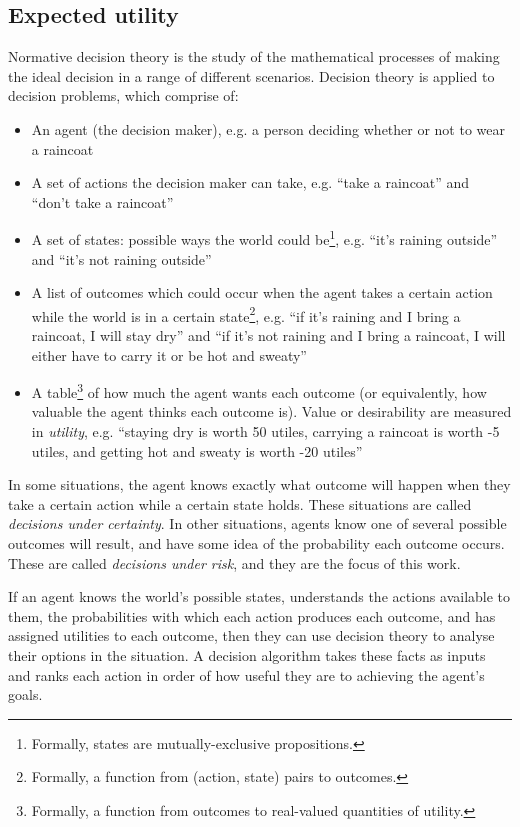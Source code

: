 \documentclass{article}
\begin{document}
\subsection{Expected utility}
Normative decision theory is the study of the mathematical processes of making the ideal decision in a range of different scenarios. Decision theory is applied to decision problems, which comprise of:

\begin{itemize}  
\item An agent (the decision maker), e.g. a person deciding whether or not to wear a raincoat
\item A set of actions the decision maker can take, e.g. ``take a raincoat'' and ``don't take a raincoat''
\item A set of states: possible ways the world could be\footnote{Formally, states are mutually-exclusive propositions.}, e.g. ``it's raining outside'' and ``it's not raining outside''
\item A list of outcomes which could occur when the agent takes a certain action while the world is in a certain state\footnote{Formally, a function from (action, state) pairs to outcomes.}, e.g. ``if it's raining and I bring a raincoat, I will stay dry'' and ``if it's not raining and I bring a raincoat, I will either have to carry it or be hot and sweaty''
\item A table\footnote{Formally, a function from outcomes to real-valued quantities of utility.} of how much the agent wants each outcome (or equivalently, how valuable the agent thinks each outcome is). Value or desirability are measured in \textit{utility}, e.g. ``staying dry is worth 50 utiles, carrying a raincoat is worth -5 utiles, and getting hot and sweaty is worth -20 utiles''
\end{itemize}

In some situations, the agent knows exactly what outcome will happen when they take a certain action while a certain state holds. These situations are called \textit{decisions under certainty}. In other situations, agents know one of several possible outcomes will result, and have some idea of the probability each outcome occurs. These are called \textit{decisions under risk}, and they are the focus of this work.

If an agent knows the world's possible states, understands the actions available to them, the probabilities with which each action produces each outcome, and has assigned utilities to each outcome, then they can use decision theory to analyse their options in the situation. A decision algorithm takes these facts as inputs and ranks each action in order of how useful they are to achieving the agent's goals. 
\end{document}
